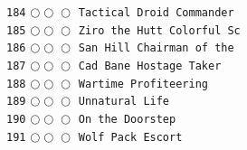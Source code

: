 \documentclass[a4paper,landscape]{article}
\begin{document}
\begin{multicols*}{5}
\texttt{184} \(\bigcirc\!\bigcirc\!\bigcirc\)  \texttt{Tactical Droid Commander} \vspace{-0.3mm}\\ 
\texttt{185} \(\bigcirc\!\bigcirc\!\bigcirc\)  \texttt{Ziro the Hutt Colorful Sc} \vspace{-0.3mm}\\ 
\texttt{186} \(\bigcirc\!\bigcirc\!\bigcirc\)  \texttt{San Hill Chairman of the } \vspace{-0.3mm}\\ 
\texttt{187} \(\bigcirc\!\bigcirc\!\bigcirc\)  \texttt{Cad Bane Hostage Taker} \vspace{-0.3mm}\\ 
\texttt{188} \(\bigcirc\!\bigcirc\!\bigcirc\)  \texttt{Wartime Profiteering} \vspace{-0.3mm}\\ 
\texttt{189} \(\bigcirc\!\bigcirc\!\bigcirc\)  \texttt{Unnatural Life} \vspace{-0.3mm}\\ 
\texttt{190} \(\bigcirc\!\bigcirc\!\bigcirc\)  \texttt{On the Doorstep} \vspace{-0.3mm}\\ 
\texttt{191} \(\bigcirc\!\bigcirc\!\bigcirc\)  \texttt{Wolf Pack Escort} \vspace{-0.3mm}\\ 

\end{multicols*}
\end{document}
